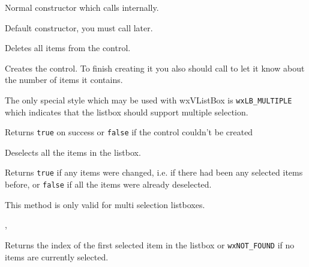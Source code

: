 Normal constructor which calls  internally.


Default constructor, you must call  later.


\label{wxvlistboxclear}


Deletes all items from the control.


\label{wxvlistboxcreate}


Creates the control. To finish creating it you also should call 
 to let it know about the
number of items it contains.

The only special style which may be used with wxVListBox is {\tt wxLB\_MULTIPLE} 
which indicates that the listbox should support multiple selection.

Returns {\tt true} on success or {\tt false} if the control couldn't be created


\label{wxvlistboxdeselectall}


Deselects all the items in the listbox.

Returns {\tt true} if any items were changed, i.e. if there had been any
selected items before, or {\tt false} if all the items were already deselected.

This method is only valid for multi selection listboxes.


, 


\label{wxvlistboxgetfirstselected}


Returns the index of the first selected item in the listbox or 
{\tt wxNOT\_FOUND} if no items are currently selected.

